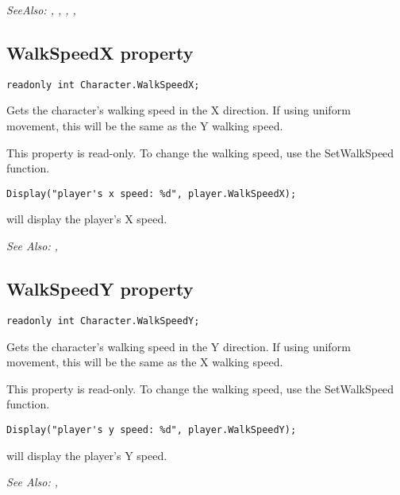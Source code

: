 \it{SeeAlso:} ,
,
,
,


\subsection{WalkSpeedX property}\label{Character.WalkSpeedX}%

\begin{verbatim}
readonly int Character.WalkSpeedX;
\end{verbatim}

Gets the character's walking speed in the X direction. If using uniform movement,
this will be the same as the Y walking speed.

This property is read-only. To change the walking speed, use the SetWalkSpeed function.

\begin{verbatim}
Display("player's x speed: %d", player.WalkSpeedX);
\end{verbatim}
will display the player's X speed.

\it{See Also:} ,


\subsection{WalkSpeedY property}\label{Character.WalkSpeedY}%

\begin{verbatim}
readonly int Character.WalkSpeedY;
\end{verbatim}

Gets the character's walking speed in the Y direction. If using uniform movement,
this will be the same as the X walking speed.

This property is read-only. To change the walking speed, use the SetWalkSpeed function.

\begin{verbatim}
Display("player's y speed: %d", player.WalkSpeedY);
\end{verbatim}
will display the player's Y speed.

\it{See Also:} ,


